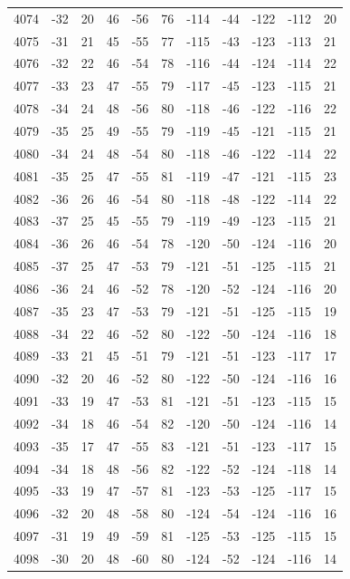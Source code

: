 \begin{table}[H]
\begin{tabular}{lllllllllll}
4074 & -32 & 20 & 46 & -56 & 76 & -114 & -44 & -122 & -112 & 20 \\
4075 & -31 & 21 & 45 & -55 & 77 & -115 & -43 & -123 & -113 & 21 \\
4076 & -32 & 22 & 46 & -54 & 78 & -116 & -44 & -124 & -114 & 22 \\
4077 & -33 & 23 & 47 & -55 & 79 & -117 & -45 & -123 & -115 & 21 \\
4078 & -34 & 24 & 48 & -56 & 80 & -118 & -46 & -122 & -116 & 22 \\
4079 & -35 & 25 & 49 & -55 & 79 & -119 & -45 & -121 & -115 & 21 \\
4080 & -34 & 24 & 48 & -54 & 80 & -118 & -46 & -122 & -114 & 22 \\
4081 & -35 & 25 & 47 & -55 & 81 & -119 & -47 & -121 & -115 & 23 \\
4082 & -36 & 26 & 46 & -54 & 80 & -118 & -48 & -122 & -114 & 22 \\
4083 & -37 & 25 & 45 & -55 & 79 & -119 & -49 & -123 & -115 & 21 \\
4084 & -36 & 26 & 46 & -54 & 78 & -120 & -50 & -124 & -116 & 20 \\
4085 & -37 & 25 & 47 & -53 & 79 & -121 & -51 & -125 & -115 & 21 \\
4086 & -36 & 24 & 46 & -52 & 78 & -120 & -52 & -124 & -116 & 20 \\
4087 & -35 & 23 & 47 & -53 & 79 & -121 & -51 & -125 & -115 & 19 \\
4088 & -34 & 22 & 46 & -52 & 80 & -122 & -50 & -124 & -116 & 18 \\
4089 & -33 & 21 & 45 & -51 & 79 & -121 & -51 & -123 & -117 & 17 \\
4090 & -32 & 20 & 46 & -52 & 80 & -122 & -50 & -124 & -116 & 16 \\
4091 & -33 & 19 & 47 & -53 & 81 & -121 & -51 & -123 & -115 & 15 \\
4092 & -34 & 18 & 46 & -54 & 82 & -120 & -50 & -124 & -116 & 14 \\
4093 & -35 & 17 & 47 & -55 & 83 & -121 & -51 & -123 & -117 & 15 \\
4094 & -34 & 18 & 48 & -56 & 82 & -122 & -52 & -124 & -118 & 14 \\
4095 & -33 & 19 & 47 & -57 & 81 & -123 & -53 & -125 & -117 & 15 \\
4096 & -32 & 20 & 48 & -58 & 80 & -124 & -54 & -124 & -116 & 16 \\
4097 & -31 & 19 & 49 & -59 & 81 & -125 & -53 & -125 & -115 & 15 \\
4098 & -30 & 20 & 48 & -60 & 80 & -124 & -52 & -124 & -116 & 14 \\

\end{tabular}
\end{table}
